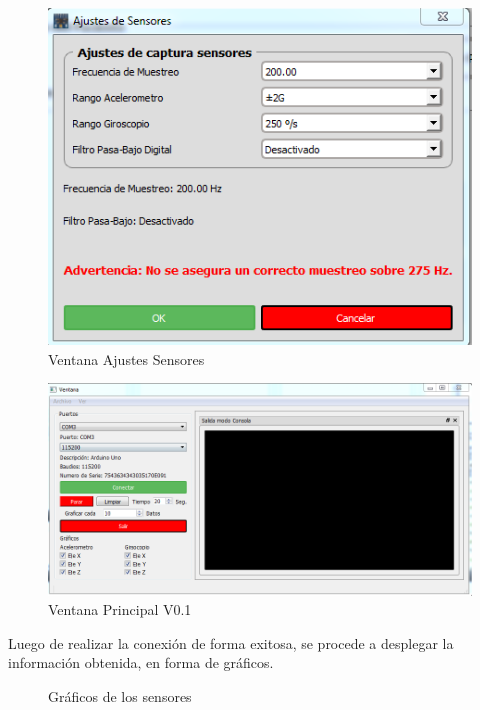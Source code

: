 \documentclass[12pt,a4paper]{article}
\begin{document}
\begin{figure}[H]
\centering
  \includegraphics[scale=0.6]{images/ajustesSensores}
  \caption{Ventana Ajustes Sensores}
  \label{fig:ajustessensores}
\end{figure}


\begin{figure}[H]
\centering
  \includegraphics[scale=0.6]{images/mainwindow}
  \caption{Ventana Principal V0.1}
  \label{fig:mainwindow}
\end{figure}

Luego de realizar la conexión de forma exitosa, se procede a desplegar la información obtenida, en forma de gráficos.

\begin{figure}[H]
\centering
  \caption{Gráficos de los sensores}
  \label{fig:Graficosensores}
\end{figure}
\end{document}
